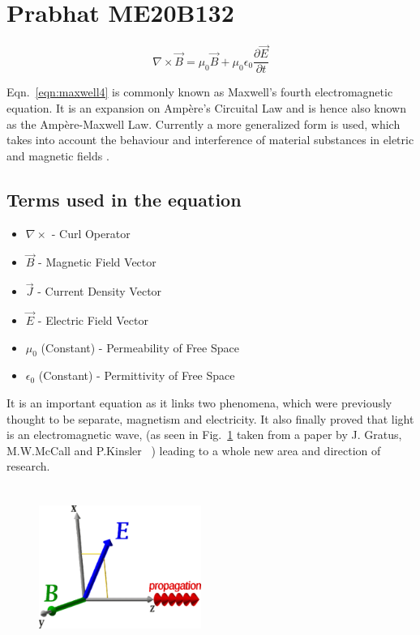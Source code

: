 \documentclass[12pt,a4paper]{article}
\author{Prabhat B}
\begin{document}
\section{Prabhat ME20B132}

\begin{equation}
\nabla\times\vec{B} = \mu_0\vec{B} + \mu_0\epsilon_0 \frac{\partial \vec{E}}{\partial t}
\label{eqn:maxwell4}
\end{equation}

Eqn.~\ref{eqn:maxwell4} is commonly known as Maxwell's fourth electromagnetic equation. It is an expansion on Amp\`{e}re's Circuital Law and is hence also known as the Amp\`{e}re-Maxwell Law. Currently a more generalized form is used, which takes into account the behaviour and interference of material substances in eletric and magnetic fields \cite{Gratus2020}.

\subsection{Terms used in the equation}
\begin{itemize}
\item $\nabla\times$ - Curl Operator
\item $\vec{B}$ - Magnetic Field Vector
\item $\vec{J}$ - Current Density Vector
\item $\vec{E}$ - Electric Field Vector
\item $\mu_0$ (Constant) - Permeability of Free Space
\item $\epsilon_0$ (Constant) - Permittivity of Free Space
\end{itemize}

It is an important equation as it links two phenomena, which were previously thought to be separate, magnetism and electricity. It also finally proved that light is an electromagnetic wave, (as seen in Fig.~\ref{fig:light} taken from a paper by J. Gratus, M.W.McCall and P.Kinsler ~\cite{Gratus2020}) leading to a whole new area and direction of research.

\begin{figure}[h]
\centerline{\includegraphics[width=200px,height=200px]{me20b132.eps}}
\label{fig:light}
\end{figure} 



\end{document}
